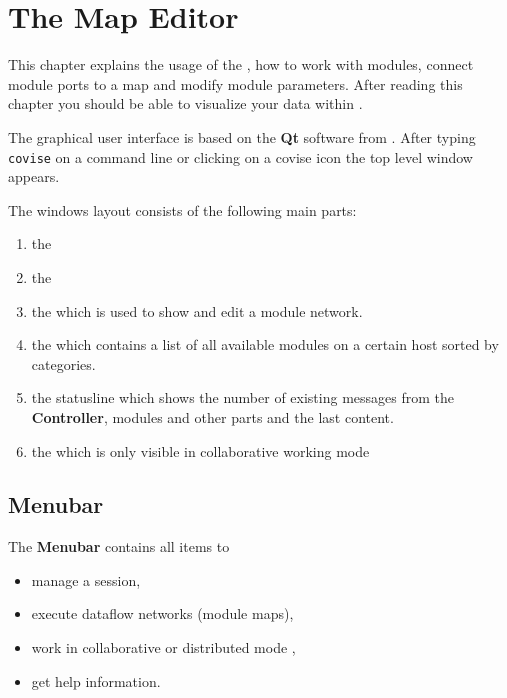     
    

	 \startdocument
	 \chapter{The Map Editor}
	 \label{qtmapeditor}

   
	 This chapter explains the usage of the {\covise} {\mapeditor}, how to work with modules, 
	 connect module ports to a map and modify module parameters. 
	 After reading this chapter you should be able to visualize your data within {\covise}. 

	 The graphical user interface is based on the {\bf Qt} software 
    from \trolltech. After typing \verb+covise+ on a command line or clicking on a covise icon the  
    {\mapeditor} top level window appears.
    
    
    The windows layout consists of the following main parts:

	 \begin{enumerate}
	    \item the \mymenubar
	    \item the \mytoolbar 
	    \item the \mycanvas which is used to show and edit a module network. 
	    \item the \mydatabrowser which contains a list of all available modules on a certain host sorted by categories.
	    \item the statusline which shows the number of existing messages from the {\bf Controller}, 
             modules and other {\covise} parts and the last content.
	    \item the \mychat which is only visible in collaborative working mode
	 \end{enumerate}
      
	


	 \section{Menubar}
	 \label{menubar}
	 
	 The {\bf Menubar} contains all items to 
	 \begin{itemize}
	 \item manage a {\covise} session,
	 \item execute dataflow networks (module maps),
	 \item work in collaborative or distributed mode ,
	 \item get help information.
	 \end{itemize}

